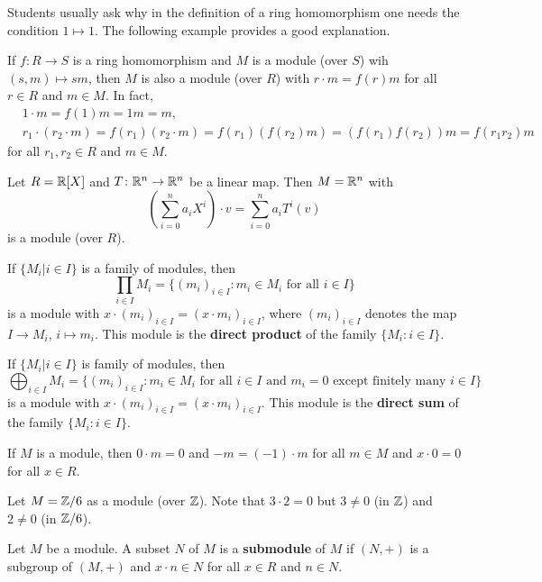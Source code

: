 Students usually ask why in the definition of a ring homomorphism one needs
the condition $1\mapsto 1$. The following example provides a good explanation. 

\begin{example}
If $f\colon R\to S$ is a ring homomorphism and $M$ is a module (over $S$) wih 
$(s,m)\mapsto sm$, then 
$M$ is also a module (over $R$) with $r\cdot m=f(r)m$ for all $r\in R$ and $m\in M$. In fact, 
\begin{align*}
&1\cdot m=f(1)m=1m=m,\\
&r_1\cdot (r_2\cdot m)=f(r_1)(r_2\cdot m)=f(r_1)(f(r_2)m)=(f(r_1)f(r_2))m=f(r_1r_2)m
\end{align*}
for all $r_1,r_2\in R$ and $m\in M$.	  	
\end{example}
%
\begin{example}
Let $R=\mathbb{R}[X]$ and $T\colon\mathbb{R}^n\to\mathbb{R}^n$ be a linear map. Then $M=\mathbb{R}^n$ with 
\[
\left(\sum_{i=0}^na_iX^i\right)\cdot v=\sum_{i=0}^na_iT^i(v)
\]	
is a module (over $R$).   
\end{example}

\begin{example}
If $\{M_i|i\in I\}$ is a family of modules, then  	
\[
\prod_{i\in I}M_i=\{(m_i)_{i\in I}:m_i\in M_i\text{ for all $i\in I$}\}
\]
is a module with 
$x\cdot (m_i)_{i\in I}=(x\cdot m_i)_{i\in I}$, 
where $(m_i)_{i\in I}$ denotes the map $I\to M_i$, $i\mapsto m_i$.
This module is the \textbf{direct product} of the family $\{M_i:i\in I\}$.
\end{example}
%
\begin{example}
If $\{M_i|i\in I\}$ is family of modules, then   	
\[
\bigoplus_{i\in I}M_i=\{(m_i)_{i\in I}:m_i\in M_i\text{ for all $i\in I$ and $m_i=0$ except finitely many $i\in I$}\}
\]
is a module with 
$x\cdot (m_i)_{i\in I}=(x\cdot m_i)_{i\in I}$. 
This module is the \textbf{direct sum} of the family $\{M_i:i\in I\}$. 
\end{example}
%
If $M$ is a module, then $0\cdot m=0$ and $-m=(-1)\cdot m$ for all $m\in M$ and 
$x\cdot 0=0$ for all $x\in R$. 
%
\begin{example}
Let $M=\mathbb{Z}/6$ as a module (over $\mathbb{Z}$). Note that 
$3\cdot 2=0$ but $3\ne 0$ (in $\mathbb{Z}$) and $2\ne 0$ (in $\mathbb{Z}/6$).  
\end{example}
%
\begin{definition}
	Let $M$ be a module. A subset $N$ of $M$ is a \textbf{submodule} of $M$ if 
	$(N,+)$ is a subgroup of $(M,+)$ and 
	$x\cdot n\in N$ for all $x\in R$ and $n\in N$. 
\end{definition}

